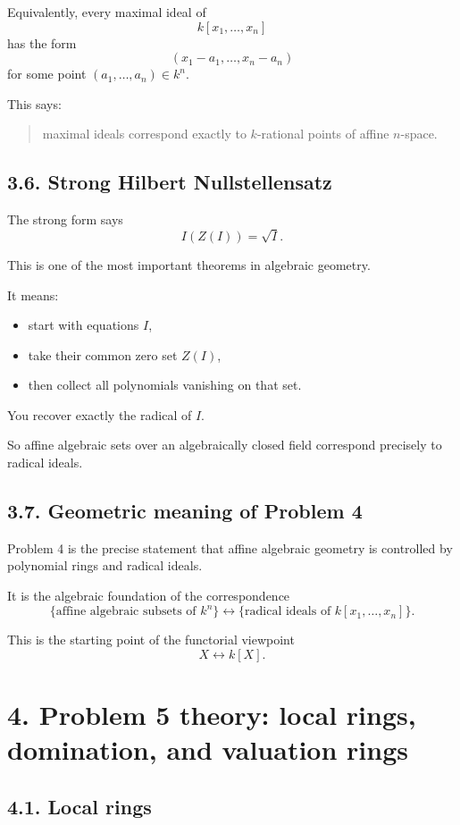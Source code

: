 \documentclass[12pt,a4paper]{article}
\theoremstyle{plain}
\theoremstyle{definition}      %
\begin{document}
Equivalently, every maximal ideal of
\[
k[x_1,\dots,x_n]
\]
has the form
\[
(x_1-a_1,\dots,x_n-a_n)
\]
for some point \((a_1,\dots,a_n)\in k^n\).

This says:
\begin{quote}
	maximal ideals correspond exactly to \(k\)-rational points of affine \(n\)-space.
\end{quote}

\subsection*{3.6. Strong Hilbert Nullstellensatz}

The strong form says
\[
I(Z(I))=\sqrt{I}.
\]

This is one of the most important theorems in algebraic geometry.

It means:
\begin{itemize}
	\item start with equations \(I\),
	\item take their common zero set \(Z(I)\),
	\item then collect all polynomials vanishing on that set.
\end{itemize}

You recover exactly the radical of \(I\).

So affine algebraic sets over an algebraically closed field correspond precisely to radical ideals.

\subsection*{3.7. Geometric meaning of Problem 4}

Problem 4 is the precise statement that affine algebraic geometry is controlled by polynomial rings and radical ideals.

It is the algebraic foundation of the correspondence
\[
\{\text{affine algebraic subsets of }k^n\}
\longleftrightarrow
\{\text{radical ideals of }k[x_1,\dots,x_n]\}.
\]

This is the starting point of the functorial viewpoint
\[
X \longleftrightarrow k[X].
\]

\bigskip

\section*{4. Problem 5 theory: local rings, domination, and valuation rings}

\subsection*{4.1. Local rings}
\end{document}
